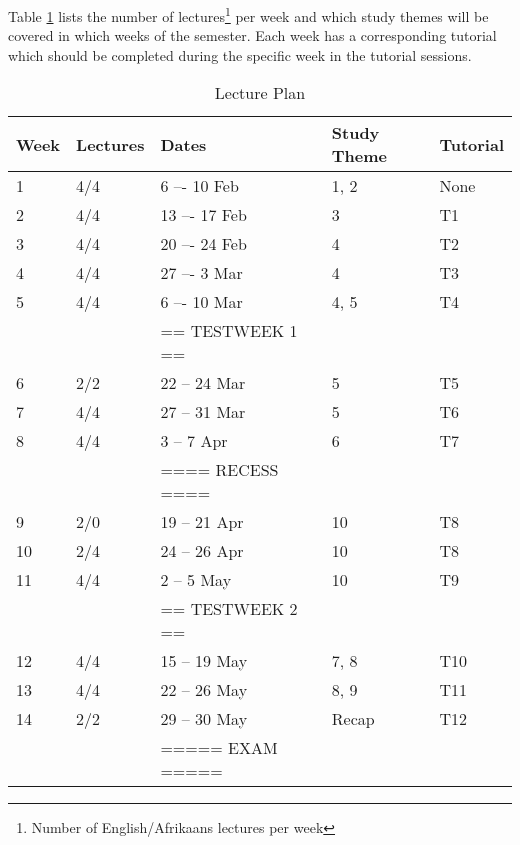         Table \ref{tab:lec_plan} lists the number of lectures\footnote{Number
        of English/Afrikaans lectures per week} per week and which study themes
        will be covered in which weeks of the semester. Each week has a
        corresponding tutorial which should be completed during the specific
        week in the tutorial sessions.

        \begin{table}[!h]
            \begin{center}
             \begin{tabular}{|l|l|l|l|l|}
                 \hline
                 {\bf Week} & {\bf Lectures} & {\bf Dates} & %
                 {\bf Study Theme} & {\bf Tutorial} \\
                 \hline
                 1  & 4/4   &  6 –- 10 Feb      & 1, 2  & None \\
                 2  & 4/4   & 13 –- 17 Feb      & 3     & T1 \\
                 3  & 4/4   & 20 –- 24 Feb      & 4     & T2 \\
                 4  & 4/4   & 27 –-  3 Mar      & 4     & T3 \\
                 5  & 4/4   &  6 –- 10 Mar      & 4, 5  & T4 \\
                    &       & == TESTWEEK 1 == &       & \\
                 6  & 2/2   & 22 -- 24 Mar      & 5     & T5 \\
                 7  & 4/4   & 27 -- 31 Mar      & 5     & T6 \\
                 8  & 4/4   &  3 --  7 Apr      & 6     & T7 \\
                    &       & ==== RECESS ==== &       & \\
                 9  & 2/0   & 19 -- 21 Apr      & 10    & T8 \\
                 10 & 2/4   & 24 -- 26 Apr      & 10    & T8 \\
                 11 & 4/4   &  2 --  5 May      & 10    & T9 \\
                    &       & == TESTWEEK 2 == &       & \\
                 12 & 4/4   & 15 -- 19 May      & 7, 8  & T10 \\
                 13 & 4/4   & 22 -- 26 May      & 8, 9  & T11 \\
                 14 & 2/2   & 29 -- 30 May      & Recap & T12 \\
                    &       & ===== EXAM ===== &       & \\
                 \hline
             \end{tabular}
             \caption{Lecture Plan} \label{tab:lec_plan}
            \end{center}
        \end{table}

